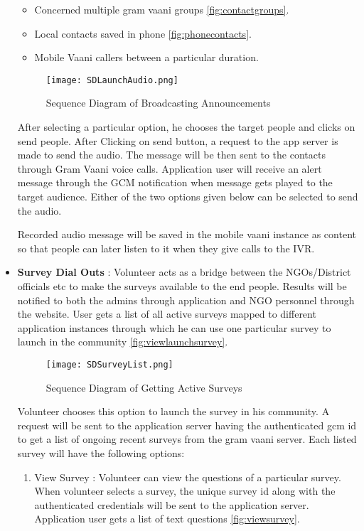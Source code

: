 \begin{itemize}
\begin{itemize}
	\item Concerned multiple gram vaani groups \ref{fig:contactgroups}.
	\item Local contacts saved in phone \ref{fig:phonecontacts}.
	\item Mobile Vaani callers between a  particular duration.
\end{itemize}

\begin{figure}[H]
    \centering
	\texttt{[image: SDLaunchAudio.png]}
    \caption{ Sequence Diagram of Broadcasting Announcements }
    \label{fig:Sequence Diagram of Broadcasting Announcements}
\end{figure}


After selecting a particular option, he chooses the target people and clicks on send people. After Clicking on send button, a request to the app server is made to send the audio. The message will be then sent to the contacts through Gram Vaani voice calls. Application user will receive an alert  message through the GCM notification when message gets played to the target audience. Either of the two options given below can be selected to send the audio.

Recorded audio message will be saved in the mobile vaani instance as content so that people can later listen to it when they give calls to the IVR.

\item \textbf{Survey Dial Outs} \label{launchsur} : Volunteer acts as a bridge between the NGOs/District officials etc to make the surveys available to the end people. Results will be notified to both the admins through application and NGO personnel through the website. User gets a list of all active surveys mapped to different application instances through which he can use one particular survey to launch in the community \ref{fig:viewlaunchsurvey}.

\begin{figure}[H]
    \centering
	\texttt{[image: SDSurveyList.png]}
    \caption{ Sequence Diagram of Getting Active Surveys}
    \label{fig:Sequence Diagram of Getting Active Surveys}
\end{figure}


Volunteer  chooses this option to launch the survey in his community. A request will be sent to the application server having the authenticated gcm id to get a list of ongoing recent surveys from the gram vaani server. Each listed survey will have the following options:
	\begin{enumerate}
	\item{ View Survey} : Volunteer can view the questions of a particular survey. When volunteer selects a survey, the unique survey id along with the authenticated credentials will be sent to the application server. Application user gets a list of text questions  \ref{fig:viewsurvey}.
	

\end{enumerate}
\end{itemize}
